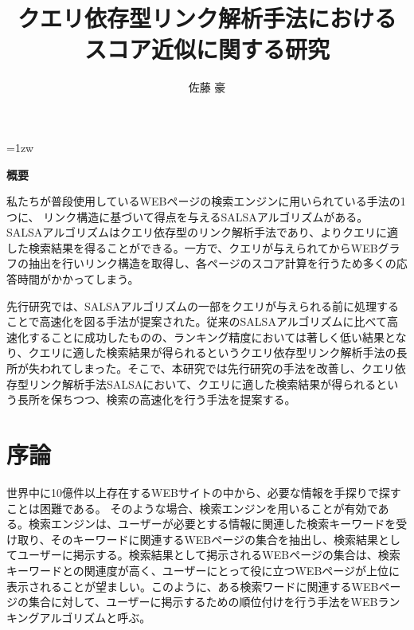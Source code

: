 \documentclass[a4paper,11pt]{jreport}
\title{クエリ依存型リンク解析手法における\\スコア近似に関する研究}
\author{佐藤 豪}
\begin{document}
\maketitle
\thispagestyle{empty}
\newpage

\thispagestyle{empty}
\vspace*{20pt plus 1fil}
\parindent=1zw
\noindent
\begin{center}
{\bf 概要}
\vspace{5mm}
\end{center}
私たちが普段使用しているWEBページの検索エンジンに用いられている手法の1つに、
リンク構造に基づいて得点を与えるSALSAアルゴリズムがある。
SALSAアルゴリズムはクエリ依存型のリンク解析手法であり、よりクエリに適した検索結果を得ることができる。一方で、クエリが与えられてからWEBグラフの抽出を行いリンク構造を取得し、各ページのスコア計算を行うため多くの応答時間がかかってしまう。

先行研究では、SALSAアルゴリズムの一部をクエリが与えられる前に処理することで高速化を図る手法が提案された。従来のSALSAアルゴリズムに比べて高速化することに成功したものの、ランキング精度においては著しく低い結果となり、クエリに適した検索結果が得られるというクエリ依存型リンク解析手法の長所が失われてしまった。そこで、本研究では先行研究の手法を改善し、クエリ依存型リンク解析手法SALSAにおいて、クエリに適した検索結果が得られるという長所を保ちつつ、検索の高速化を行う手法を提案する。


\par
\vspace{0pt plus 1fil}
\newpage

\tableofcontents
\listoffigures

\pagebreak \setcounter{page}{1}


\chapter{序論}

世界中に10億件以上存在するWEBサイトの中から、必要な情報を手探りで探すことは困難である。
そのような場合、検索エンジンを用いることが有効である。検索エンジンは、ユーザーが必要とする情報に関連した検索キーワードを受け取り、そのキーワードに関連するWEBページの集合を抽出し、検索結果としてユーザーに掲示する。検索結果として掲示されるWEBページの集合は、検索キーワードとの関連度が高く、ユーザーにとって役に立つWEBページが上位に表示されることが望ましい。このように、ある検索ワードに関連するWEBページの集合に対して、ユーザーに掲示するための順位付けを行う手法をWEBランキングアルゴリズムと呼ぶ。
\end{document}
